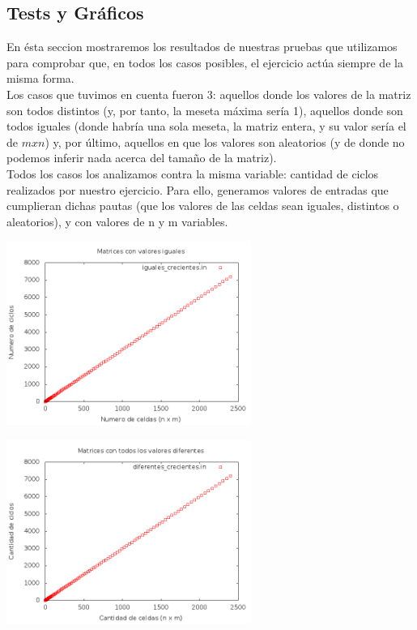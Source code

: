 \subsection{Tests y Gráficos}

En ésta seccion mostraremos los resultados de nuestras pruebas que utilizamos para comprobar que, en todos los casos posibles, el ejercicio actúa siempre de la misma forma. \\
Los casos que tuvimos en cuenta fueron 3: aquellos donde los valores de la matriz son todos distintos (y, por tanto, la meseta máxima sería 1), aquellos donde son todos iguales (donde habría una sola meseta, la matriz entera, y su valor sería el de $m x n$) y, por último, aquellos en que los valores son aleatorios (y de donde no podemos inferir nada acerca del tamaño de la matriz). \\
Todos los casos los analizamos contra la misma variable: cantidad de ciclos realizados por nuestro ejercicio. Para ello, generamos valores de entradas que cumplieran dichas pautas (que los valores de las celdas sean iguales, distintos o aleatorios), y con valores de n y m variables.  \\

\begin {center}
\includegraphics[width=8cm]{./graficos/igualesCrecientes.png}
\end {center} 

\begin {center}
\includegraphics[width=8cm]{./graficos/diferentesCrecientes.png}
\end {center} 


